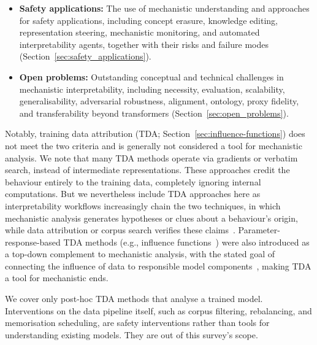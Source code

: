 \begin{itemize}
    \item \textbf{Safety applications:} The use of mechanistic understanding and approaches for safety applications, including concept erasure, knowledge editing, representation steering, mechanistic monitoring, and automated interpretability agents, together with their risks and failure modes (Section~\ref{sec:safety_applications}).

    \item \textbf{Open problems:} Outstanding conceptual and technical challenges in mechanistic interpretability, including necessity, evaluation, scalability, generalisability, adversarial robustness, alignment, ontology, proxy fidelity, and transferability beyond transformers (Section~\ref{sec:open_problems}).
\end{itemize}

Notably, training data attribution (TDA; Section~\ref{sec:influence-functions}) does not meet the two criteria and is generally not considered a tool for mechanistic analysis. 
We note that many TDA methods operate via gradients or verbatim search, instead of intermediate representations. These approaches credit the behaviour entirely to the training data, completely ignoring internal computations. But we nevertheless include TDA approaches here as interpretability workflows increasingly chain the two techniques, in which mechanistic analysis generates hypotheses or clues about a behaviour's origin, while data attribution or corpus search verifies these claims~. 
Parameter-response-based TDA methods (e.g., influence functions~) were also introduced as a top-down complement to mechanistic analysis, with the stated goal of connecting the influence of data to responsible model components~, making TDA a tool for mechanistic ends. 

We cover only post-hoc TDA methods that analyse a trained model. Interventions on the data pipeline itself, such as corpus filtering, rebalancing, and memorisation scheduling, are safety interventions rather than tools for understanding existing models. They are out of this survey's scope.

